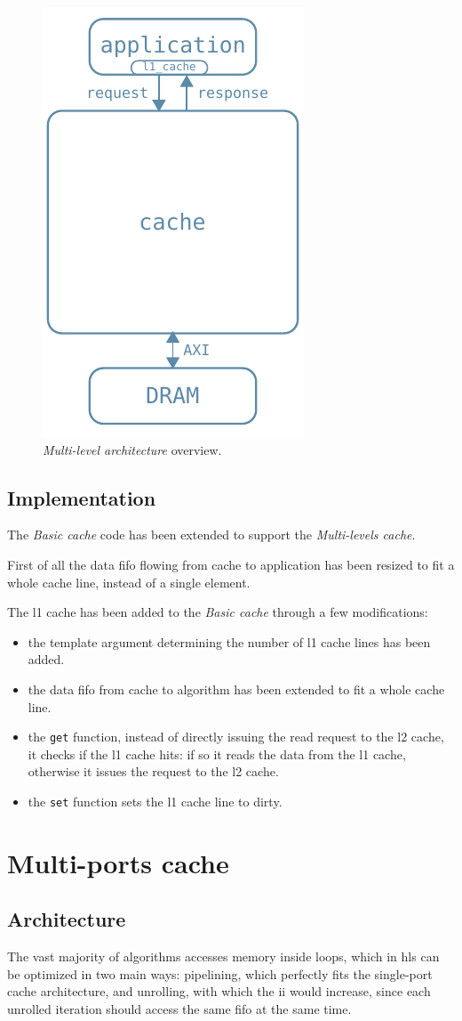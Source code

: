 \documentclass[11pt,a4paper,oneside]{memoir}
\begin{document}
\begin{figure}
	\centering
	\includegraphics[width=.3\textwidth]{l1_arch}
	\caption{\emph{Multi-level architecture} overview.}
	\label{fig:l1_arch}
\end{figure}

\subsection{Implementation}
The \emph{Basic cache} code has been extended to support the \emph{Multi-levels
cache}.

First of all the data \ac{fifo} flowing from cache to application has been
resized to fit a whole cache line, instead of a single element.


The \ac{l1} cache has been added to the \emph{Basic cache} through a few
modifications:
\begin{itemize}
	\item the template argument determining the number of \ac{l1} cache
		lines has been added.
	\item the data \ac{fifo} from cache to algorithm has been extended to
		fit a whole cache line.
	\item the \texttt{get} function, instead of directly issuing the read
		request to the \ac{l2} cache, it checks if the \ac{l1} cache
		hits: if so it reads the data from the \ac{l1} cache, otherwise
		it issues the request to the \ac{l2} cache.
	\item the \texttt{set} function sets the \ac{l1} cache line to dirty.
\end{itemize}

\section{Multi-ports cache}
\subsection{Architecture}
The vast majority of algorithms accesses memory inside loops, which in \ac{hls}
can be optimized in two main ways: pipelining, which perfectly fits the
single-port cache architecture, and unrolling, with which the \ac{ii} would
increase, since each unrolled iteration should access the same \ac{fifo} at the
same time.
\end{document}
